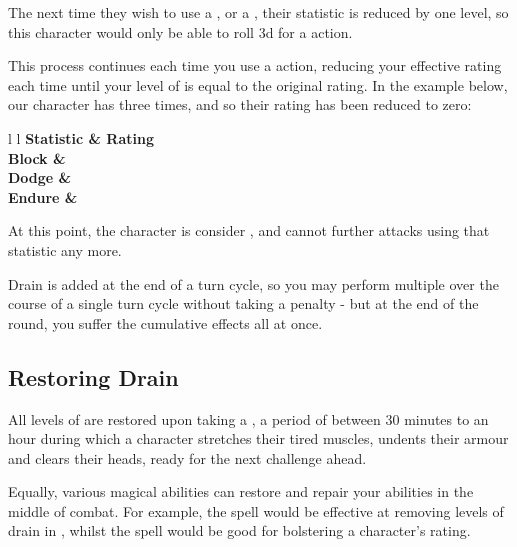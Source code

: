 The next time they wish to use a , or a , their  statistic is reduced by one level, so this character would only be able to roll 3d for a  action. 

This process continues each time you use a  action, reducing your effective rating each time until your level of  is equal to the original rating. In the example below, our character has  three times, and so their  rating has been reduced to zero:

\begin{center}
	\begin{rndtable}{l l}
		\bf Statistic	&	\bf Rating
		\\
		\bf Block	&	\defenseStar{1}{1}\defenseStar{1}{0}\defenseStar{0}{0}
		\\
		\bf Dodge & 
		\\
		\bf Endure & 
	\end{rndtable}
\end{center}

At this point, the character is consider , and cannot  further attacks using that statistic any more. 

Drain is added at the end of a turn cycle, so you may perform multiple  over the course of a single turn cycle without taking a penalty - but at the end of the round, you suffer the cumulative effects all at once. 

\subsection{Restoring Drain}

All levels of  are restored upon taking a , a period of between 30 minutes to an hour during which a character stretches their tired muscles, undents their armour and clears their heads, ready for the next challenge ahead. 

Equally, various magical abilities can restore and repair your abilities in the middle of combat. For example, the  spell would be effective at removing levels of drain in , whilst the  spell would be good for bolstering a character's  rating.


